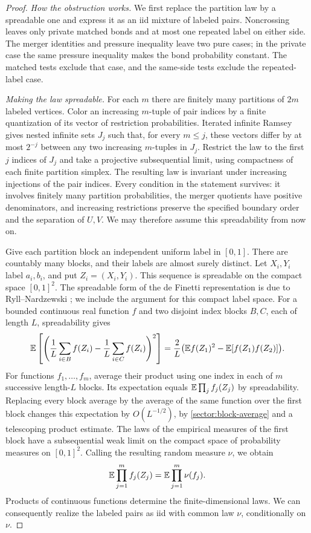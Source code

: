 \begin{proof}
\emph{How the obstruction works.}
We first replace the partition law by a spreadable one and express it
as an iid mixture of labeled pairs.  Noncrossing leaves only private
matched bonds and at most one repeated label on either side.  The
merger identities and pressure inequality leave two pure cases; in
the private case the same pressure inequality makes the bond probability
constant.  The matched tests exclude that case, and the same-side
tests exclude the repeated-label case.

\emph{Making the law spreadable.}
For each $m$ there are finitely many partitions of $2m$ labeled
vertices.  Color an increasing $m$-tuple of pair indices by a finite
quantization of its vector of restriction probabilities.  Iterated
infinite Ramsey \cite[Theorem~A]{Ramsey1930} gives nested infinite sets
$J_j$ such that, for every
$m\leq j$, these vectors differ by at most $2^{-j}$ between any two
increasing $m$-tuples in $J_j$.  Restrict the law to the first $j$
indices of $J_j$ and take a projective subsequential limit, using
compactness of each finite partition simplex.  The resulting law is
invariant under increasing injections of the pair indices.  Every
condition in the statement survives: it involves finitely many
partition probabilities, the merger quotients have positive
denominators, and increasing restrictions preserve the specified
boundary order and the separation of $U,V$.  We may therefore assume
this spreadability from now on.

Give each partition block an independent uniform label in $[0,1]$.
There are countably many blocks, and their labels are almost surely
distinct.  Let $X_i,Y_i$ label $a_i,b_i$, and put $Z_i=(X_i,Y_i)$.
This sequence is spreadable on the compact space $[0,1]^2$.
The spreadable form of the de Finetti representation is due to
Ryll--Nardzewski \cite{RyllNardzewski1957}; we include the argument for
this compact label space.  For a bounded continuous real
function $f$ and two disjoint index blocks $B,C$, each of length $L$,
spreadability gives
\begin{equation}\label{sector:block-average}
 \mathbb E\left[\left(\frac1L\sum_{i\in B}f(Z_i)
                    -\frac1L\sum_{i\in C}f(Z_i)\right)^2\right]
 =\frac2L\bigl(\mathbb E f(Z_1)^2-\mathbb E[f(Z_1)f(Z_2)]\bigr).
\end{equation}
For functions $f_1,\ldots,f_m$, average their product using one index
in each of $m$ successive length-$L$ blocks.  Its expectation equals
$\mathbb E\prod_j f_j(Z_j)$ by spreadability.  Replacing every block average
by the average of the same function over the first block changes this
expectation by $O(L^{-1/2})$, by \eqref{sector:block-average} and a
telescoping product estimate.  The laws of the empirical measures of
the first block have a subsequential weak limit on the compact space
of probability measures on $[0,1]^2$.  Calling the resulting random
measure $\nu$, we obtain
\[
 \mathbb E\prod_{j=1}^m f_j(Z_j)=\mathbb E\prod_{j=1}^m\nu(f_j).
\]
Products of continuous functions determine the finite-dimensional
laws.  We can consequently realize the labeled pairs as iid with
common law $\nu$, conditionally on $\nu$.


\end{proof}
